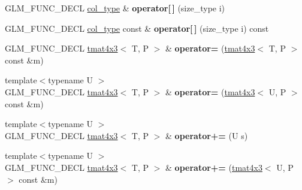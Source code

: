 \begin{DoxyCompactItemize}
\item 
\hypertarget{structglm_1_1detail_1_1tmat4x3_a7c0a9a47c01b37d13ac412b24300c16a}{G\-L\-M\-\_\-\-F\-U\-N\-C\-\_\-\-D\-E\-C\-L \hyperlink{structglm_1_1detail_1_1tvec3}{col\-\_\-type} \& {\bfseries operator\mbox{[}$\,$\mbox{]}} (size\-\_\-type i)}\label{structglm_1_1detail_1_1tmat4x3_a7c0a9a47c01b37d13ac412b24300c16a}

\item 
\hypertarget{structglm_1_1detail_1_1tmat4x3_a8dd9a56f0f1aea3919317bb25486cae1}{G\-L\-M\-\_\-\-F\-U\-N\-C\-\_\-\-D\-E\-C\-L \hyperlink{structglm_1_1detail_1_1tvec3}{col\-\_\-type} const \& {\bfseries operator\mbox{[}$\,$\mbox{]}} (size\-\_\-type i) const }\label{structglm_1_1detail_1_1tmat4x3_a8dd9a56f0f1aea3919317bb25486cae1}

\item 
\hypertarget{structglm_1_1detail_1_1tmat4x3_a7d7570c16297f45b77cda4686e2d7725}{G\-L\-M\-\_\-\-F\-U\-N\-C\-\_\-\-D\-E\-C\-L \hyperlink{structglm_1_1detail_1_1tmat4x3}{tmat4x3}$<$ T, P $>$ \& {\bfseries operator=} (\hyperlink{structglm_1_1detail_1_1tmat4x3}{tmat4x3}$<$ T, P $>$ const \&m)}\label{structglm_1_1detail_1_1tmat4x3_a7d7570c16297f45b77cda4686e2d7725}

\item 
\hypertarget{structglm_1_1detail_1_1tmat4x3_a78d228bf3b4923aaf3514d63d4bb4afd}{{\footnotesize template$<$typename U $>$ }\\G\-L\-M\-\_\-\-F\-U\-N\-C\-\_\-\-D\-E\-C\-L \hyperlink{structglm_1_1detail_1_1tmat4x3}{tmat4x3}$<$ T, P $>$ \& {\bfseries operator=} (\hyperlink{structglm_1_1detail_1_1tmat4x3}{tmat4x3}$<$ U, P $>$ const \&m)}\label{structglm_1_1detail_1_1tmat4x3_a78d228bf3b4923aaf3514d63d4bb4afd}

\item 
\hypertarget{structglm_1_1detail_1_1tmat4x3_a1708ebf2fc22d00a114f77794da8bc22}{{\footnotesize template$<$typename U $>$ }\\G\-L\-M\-\_\-\-F\-U\-N\-C\-\_\-\-D\-E\-C\-L \hyperlink{structglm_1_1detail_1_1tmat4x3}{tmat4x3}$<$ T, P $>$ \& {\bfseries operator+=} (U s)}\label{structglm_1_1detail_1_1tmat4x3_a1708ebf2fc22d00a114f77794da8bc22}

\item 
\hypertarget{structglm_1_1detail_1_1tmat4x3_a2b0c10c2d6d2183c6dc36027028fa8bd}{{\footnotesize template$<$typename U $>$ }\\G\-L\-M\-\_\-\-F\-U\-N\-C\-\_\-\-D\-E\-C\-L \hyperlink{structglm_1_1detail_1_1tmat4x3}{tmat4x3}$<$ T, P $>$ \& {\bfseries operator+=} (\hyperlink{structglm_1_1detail_1_1tmat4x3}{tmat4x3}$<$ U, P $>$ const \&m)}\label{structglm_1_1detail_1_1tmat4x3_a2b0c10c2d6d2183c6dc36027028fa8bd}


\end{DoxyCompactItemize}
